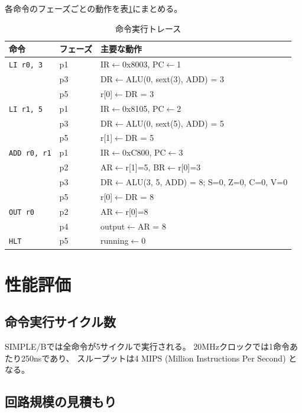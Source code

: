 \documentclass[a4paper,11pt]{ltjsarticle}
\begin{document}
各命令のフェーズごとの動作を表\ref{tab:trace}にまとめる。

\begin{table}[h]
\centering
\caption{命令実行トレース}
\label{tab:trace}
\small
\begin{tabular}{l|l|l}
\toprule
命令 & フェーズ & 主要な動作 \\
\midrule
\texttt{LI r0, 3} & p1 & IR$\leftarrow$0x8003, PC$\leftarrow$1 \\
                   & p3 & DR$\leftarrow$ALU(0, sext(3), ADD) = 3 \\
                   & p5 & r[0]$\leftarrow$DR = 3 \\
\midrule
\texttt{LI r1, 5} & p1 & IR$\leftarrow$0x8105, PC$\leftarrow$2 \\
                   & p3 & DR$\leftarrow$ALU(0, sext(5), ADD) = 5 \\
                   & p5 & r[1]$\leftarrow$DR = 5 \\
\midrule
\texttt{ADD r0, r1} & p1 & IR$\leftarrow$0xC800, PC$\leftarrow$3 \\
                     & p2 & AR$\leftarrow$r[1]=5, BR$\leftarrow$r[0]=3 \\
                     & p3 & DR$\leftarrow$ALU(3, 5, ADD) = 8; S=0, Z=0, C=0, V=0 \\
                     & p5 & r[0]$\leftarrow$DR = 8 \\
\midrule
\texttt{OUT r0}    & p2 & AR$\leftarrow$r[0]=8 \\
                   & p4 & output$\leftarrow$AR = 8 \\
\midrule
\texttt{HLT}       & p5 & running$\leftarrow$0 \\
\bottomrule
\end{tabular}
\end{table}


\section{性能評価}

\subsection{命令実行サイクル数}

SIMPLE/Bでは全命令が5サイクルで実行される。
20MHzクロックでは1命令あたり250nsであり、
スループットは4 MIPS (Million Instructions Per Second) となる。

\subsection{回路規模の見積もり}
\end{document}
